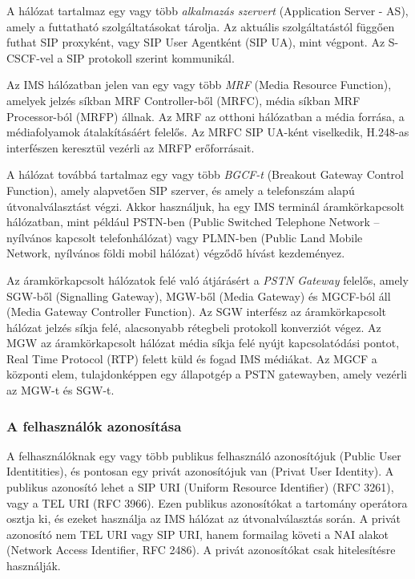 A hálózat tartalmaz egy vagy több \emph{alkalmazás szervert} (Application Server - AS), amely a futtatható szolgáltatásokat tárolja. Az aktuális szolgáltatástól függően futhat SIP proxyként, vagy SIP User Agentként (SIP UA), mint végpont. Az S-CSCF-vel a SIP protokoll szerint kommunikál.

Az IMS hálózatban jelen van egy vagy több \emph{MRF} (Media Resource Function), amelyek jelzés síkban MRF Controller-ből (MRFC), média síkban MRF Processor-ból (MRFP) állnak.  Az MRF az otthoni hálózatban a média forrása, a médiafolyamok átalakításáért felelős. Az MRFC SIP UA-ként viselkedik, H.248-as interfészen keresztül vezérli az MRFP erőforrásait.

A hálózat továbbá tartalmaz egy vagy több \emph{BGCF-t} (Breakout Gateway Control Function), amely alapvetően SIP szerver, és amely a telefonszám alapú út\-vo\-nal\-vá\-lasz\-tást végzi. Akkor használjuk, ha egy IMS terminál áramkörkapcsolt hálózatban, mint például PSTN-ben (Public Switched Telephone Network – nyílvános kapcsolt telefonhálózat) vagy PLMN-ben (Public Land Mobile Network, nyílvános földi mobil hálózat) végződő hívást kezdeményez.

Az áramkörkapcsolt hálózatok felé való átjárásért a \emph{PSTN Gateway} felelős, a\-mely SGW-ből (Signalling Gateway), MGW-ből (Media Gateway) és MGCF-ból áll (Media Gateway Controller Function). Az SGW interfész az áramkörkapcsolt hálózat jelzés síkja felé, alacsonyabb rétegbeli protokoll konverziót végez. Az MGW az áramkörkapcsolt hálózat média síkja felé nyújt kapcsolatódási pontot, Real Time Protocol (RTP) felett küld és fogad IMS médiákat. Az MGCF a központi elem, tulajdonképpen egy állapotgép a PSTN gatewayben, amely vezérli az MGW-t és SGW-t.

\subsubsection{A felhasználók azonosítása}

A felhasználóknak egy vagy több publikus felhasználó azonosítójuk (Public User Identitities), és pontosan egy privát azonosítójuk van (Privat User Identity). A publikus azonosító lehet a SIP URI (Uniform Resource Identifier) (RFC 3261), vagy a TEL URI (RFC 3966). Ezen publikus azonosítókat a tartomány operátora osztja ki, és ezeket használja az IMS hálózat az útvonalválasztás során. A privát azonosító nem TEL URI vagy SIP URI, hanem formailag követi a NAI alakot (Network Access Identifier, RFC 2486). A privát azonosítókat csak hitelesítésre használják.

